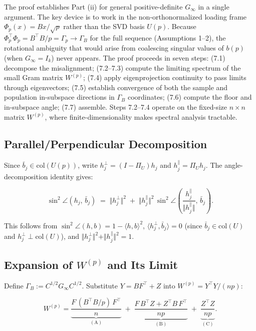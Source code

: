 \documentclass{article}
\theoremstyle{remark}
\begin{document}
The proof establishes Part (ii) for general positive-definite $G_\infty$ in a single argument. The key device is to work in the non-orthonormalized loading frame $\Phi_p(x) = Bx/\sqrt{p}$ rather than the SVD basis $U(p)$. Because $\Phi_p^\top\Phi_p = B^\top B/p = \Gamma_p \to \Gamma_B$ for the full sequence (Assumptions 1–2), the rotational ambiguity that would arise from coalescing singular values of $b(p)$ (when $G_\infty = I_k$) never appears. The proof proceeds in seven steps: (7.1) decompose the misalignment; (7.2–7.3) compute the limiting spectrum of the small Gram matrix $W^{(p)}$; (7.4) apply eigenprojection continuity to pass limits through eigenvectors; (7.5) establish convergence of both the sample and population in-subspace directions in $\Gamma_B$ coordinates; (7.6) compute the floor and in-subspace angle; (7.7) assemble. Steps 7.2–7.4 operate on the fixed-size $n\times n$ matrix $W^{(p)}$, where finite-dimensionality makes spectral analysis tractable.

\subsection{Parallel/Perpendicular Decomposition}

Since $\bar{b}_j\in\mathrm{col}(U(p))$, write $h_j^\perp = (I-\Pi_U)h_j$ and $h_j^{\parallel} = \Pi_U h_j$. The angle-decomposition identity gives:

\[
\sin^2\angle(h_j,\,\bar{b}_j) \;=\; \Vert h_j^\perp\Vert^2 \;+\; \Vert h_j^{\parallel}\Vert^2\,\sin^2\!\angle\!\left(\frac{h_j^{\parallel}}{\Vert h_j^{\parallel}\Vert },\,\bar{b}_j\right). \tag{9}
\]

This follows from $\sin^2\angle(h,b) = 1-\langle h,b\rangle^2$, $\langle h_j^\perp, \bar{b}_j\rangle = 0$ (since $\bar{b}_j\in\mathrm{col}(U)$ and $h_j^\perp\perp\mathrm{col}(U)$), and $\Vert h_j^\perp\Vert^2 + \Vert h_j^{\parallel}\Vert^2 = 1$.

\subsection{Expansion of $W^{(p)}$ and Its Limit}

Define $\Gamma_B := C^{1/2}G_\infty C^{1/2}$. Substitute $Y = BF^\top + Z$ into $W^{(p)} = Y^\top Y/(np)$:

\[
W^{(p)} = \underbrace{\frac{F\,(B^\top B/p)\,F^\top}{n}}_{(\mathrm{A})} \;+\; \underbrace{\frac{F\,B^\top Z + Z^\top B\,F^\top}{np}}_{(\mathrm{B})} \;+\; \underbrace{\frac{Z^\top Z}{np}}_{(\mathrm{C})}. \tag{10}
\]
\end{document}
